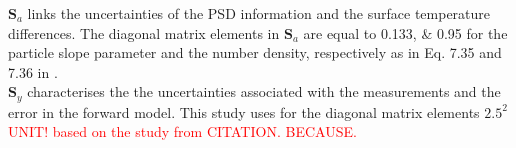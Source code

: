 $\mathbf{S}_a$ links the uncertainties of the PSD information and the surface temperature differences. The diagonal matrix elements in $\mathbf{S}_a$ are equal to \numlist{0.133;0.95} for the particle slope parameter and the number density, respectively as in Eq. 7.35 and 7.36 in \cite{wood_estimation_2011}. \\
$\mathbf{S}_y$ characterises the the uncertainties associated with the measurements and the error in the forward model. This study uses for the diagonal matrix elements $2.5^2$ \textcolor{red}{UNIT! based on the study from CITATION. BECAUSE.}
\\
